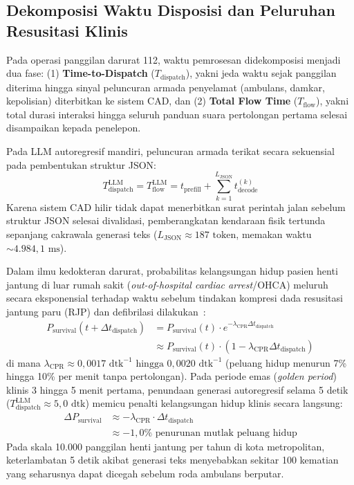 \documentclass[journal,compsoc]{IEEEtran}
\begin{document}
\subsection{Dekomposisi Waktu Disposisi dan Peluruhan Resusitasi Klinis}
Pada operasi panggilan darurat 112, waktu pemrosesan didekomposisi menjadi dua fase: (1) \textbf{Time-to-Dispatch} ($T_{\text{dispatch}}$), yakni jeda waktu sejak panggilan diterima hingga sinyal peluncuran armada penyelamat (ambulans, damkar, kepolisian) diterbitkan ke sistem CAD, dan (2) \textbf{Total Flow Time} ($T_{\text{flow}}$), yakni total durasi interaksi hingga seluruh panduan suara pertolongan pertama selesai disampaikan kepada penelepon.

Pada LLM autoregresif mandiri, peluncuran armada terikat secara sekuensial pada pembentukan struktur JSON:
\begin{equation}
T_{\text{dispatch}}^{\text{LLM}} = T_{\text{flow}}^{\text{LLM}} = t_{\text{prefill}} + \sum_{k=1}^{L_{\text{JSON}}} t_{\text{decode}}^{(k)}
\end{equation}
Karena sistem CAD hilir tidak dapat menerbitkan surat perintah jalan sebelum struktur JSON selesai divalidasi, pemberangkatan kendaraan fisik tertunda sepanjang cakrawala generasi teks ($L_{\text{JSON}} \approx 187 \text{ token}$, memakan waktu $\sim 4.984{,}1 \text{ ms}$).

Dalam ilmu kedokteran darurat, probabilitas kelangsungan hidup pasien henti jantung di luar rumah sakit (\textit{out-of-hospital cardiac arrest}/OHCA) meluruh secara eksponensial terhadap waktu sebelum tindakan kompresi dada resusitasi jantung paru (RJP) dan defibrilasi dilakukan~\cite{eisenberg2001cardiac}:
\begin{equation}
\begin{aligned}
P_{\text{survival}}(t + \Delta t_{\text{dispatch}}) &= P_{\text{survival}}(t) \cdot e^{-\lambda_{\text{CPR}} \Delta t_{\text{dispatch}}} \\
&\approx P_{\text{survival}}(t) \cdot (1 - \lambda_{\text{CPR}} \Delta t_{\text{dispatch}})
\end{aligned}
\end{equation}
di mana $\lambda_{\text{CPR}} \approx 0{,}0017 \text{ dtk}^{-1} \text{ hingga } 0{,}0020 \text{ dtk}^{-1}$ (peluang hidup menurun 7\% hingga 10\% per menit tanpa pertolongan). Pada periode emas (\textit{golden period}) klinis 3 hingga 5 menit pertama, penundaan generasi autoregresif selama 5 detik ($T_{\text{dispatch}}^{\text{LLM}} \approx 5{,}0 \text{ dtk}$) memicu penalti kelangsungan hidup klinis secara langsung:
\begin{equation}
\begin{aligned}
\Delta P_{\text{survival}} &\approx - \lambda_{\text{CPR}} \cdot \Delta t_{\text{dispatch}} \\
&\approx -1{,}0\% \text{ penurunan mutlak peluang hidup}
\end{aligned}
\end{equation}
Pada skala 10.000 panggilan henti jantung per tahun di kota metropolitan, keterlambatan 5 detik akibat generasi teks menyebabkan sekitar 100 kematian yang seharusnya dapat dicegah sebelum roda ambulans berputar.
\end{document}

